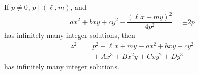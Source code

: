 \begin{proposition}
    If $p\ne0$, $p\mid(\ell,m)$, and
\[
    ax^2+bxy+cy^2-\frac{(\ell x+my)^2}{4p^2}=\pm2p
\]
    has infinitely many integer solutions, then
\[
    \begin{aligned}z^2={}&p^2+\ell x+my+ax^2+bxy+cy^2\\&{}+Ax^3+Bx^2y+Cxy^2+Dy^3\end{aligned}
\]
    has infinitely many integer solutions.
\end{proposition}
